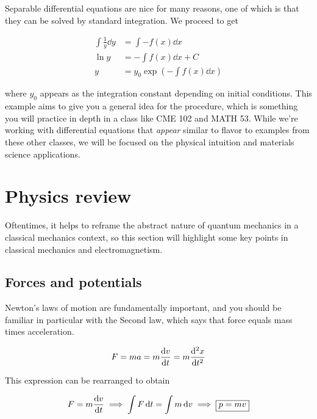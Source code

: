 Separable differential equations are nice for many reasons, one of which is that they can be solved by standard integration. 
We proceed to get

\begin{align*}
	\int\frac{1}{y}\dd{y} &= \int-f(x)\dd{x} \\
	\ln y &= -\int f(x)\dd{x} + C \\
	y &= y_0\exp\left(-\int f(x)\dd{x}\right)
\end{align*}

\noindent where $y_0$ appears as the integration constant depending on initial conditions. 
This example aims to give you a general idea for the procedure, which is something you will practice in depth in a class like CME 102 and MATH 53.
While we're working with differential equations that \emph{appear} similar to flavor to examples from these other classes, we will be focused on the physical intuition and materials science applications.



\section{Physics review}

Oftentimes, it helps to reframe the abstract nature of quantum mechanics in a classical mechanics context, so this section will highlight some key points in classical mechanics and electromagnetism.


\subsection{Forces and potentials}

Newton's laws of motion are fundamentally important, and you should be familiar in particular with the Second law, which says that force equals mass times acceleration.

\begin{tcolorbox}[title=Newton's Second law] \vspace{-2ex}
	\[ F = ma = m \dv{v}{t} = m\dv[2]{x}{t} \]
\end{tcolorbox} 

This expression can be rearranged to obtain 

\begin{equation*}
	F = m\dv{v}{t} \implies \int F\dd{t} = \int m\dd{v} \implies \boxed{p = mv}
\end{equation*}

